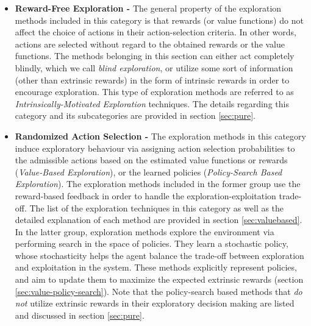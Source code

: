 \begin{itemize}
	\item \textbf{Reward-Free Exploration -} The general property of the exploration methods included in this category is that rewards (or value functions) do not affect the choice of actions in their action-selection criteria. In other words, actions are selected without regard to the obtained rewards or the value functions. The methods belonging in this section can either act completely blindly, which we call \emph{blind exploration}, or utilize some sort of information (other than extrinsic rewards) in the form of intrinsic rewards in order to encourage exploration. This type of exploration methods are referred to as \emph{Intrinsically-Motivated Exploration} techniques. The details regarding this category and its subcategories are provided in section \ref{sec:pure}.
	\item \textbf{Randomized Action Selection -} The exploration methods in this category induce exploratory behaviour via assigning action selection probabilities to the admissible actions based on the estimated value functions or rewards (\emph{Value-Based Exploration}), or the learned policies (\emph{Policy-Search Based Exploration}). The exploration methods included in the former group use the reward-based feedback in order to handle the exploration-exploitation trade-off. The list of the exploration techniques in this category as well as the detailed explanation of each method are provided in section \ref{sec:valuebased}. In the latter group, exploration methods explore the environment via performing search in the space of policies. They learn a stochastic policy, whose stochasticity helps the agent balance the trade-off between exploration and exploitation in the system. These methods explicitly represent policies, and aim to update them to maximize the expected extrinsic rewards (section \ref{sec:value-policy-search}). Note that the policy-search based methods that \emph{do not} utilize extrinsic rewards in their exploratory decision making are listed and discussed in section \ref{sec:pure}.

\end{itemize}
